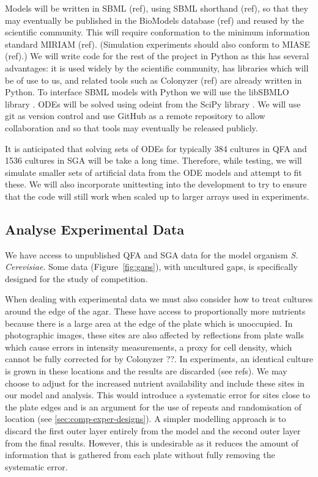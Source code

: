 Models will be written in SBML (ref), using SBML shorthand (ref), so
that they may eventually be published in the BioModels database (ref)
and reused by the scientific community. This will require conformation
to the minimum information standard MIRIAM (ref). (Simulation
experiments should also conform to MIASE (ref).) We will write code
for the rest of the project in Python as this has several advantages:
it is used widely by the scientific community, has libraries which
will be of use to us, and related tools such as Colonyzer (ref) are
already written in Python. To interface SBML models with Python we
will use the libSBMLO library \citep{Bornstein2008}. ODEs will be
solved using odeint from the SciPy library \citep{SciPy}. We will use
git as version control and use GitHub as a remote repository to allow
collaboration and so that tools may eventually be released publicly.

It is anticipated that solving sets of ODEs for typically 384 cultures
in QFA and 1536 cultures in SGA will be take a long time. Therefore,
while testing, we will simulate smaller sets of artificial data from
the ODE models and attempt to fit these. We will also incorporate
unittesting into the development to try to ensure that the code will
still work when scaled up to larger arrays used in experiments.

\subsection{Analyse Experimental Data}
\label{sec:analyse-data}
We have access to unpublished QFA and SGA data for the model organism \textit{S. Cerevisiae}. Some data (Figure~\ref{fig:gaps}), with uncultured gaps, is specifically designed for the study of competition.

When dealing with experimental data we must also consider how to treat
cultures around the edge of the agar. These have access to
proportionally more nutrients because there is a large area at the
edge of the plate which is unoccupied. In photographic images, these
sites are also affected by reflections from plate walls which cause
errors in intensity measurements, a proxy for cell density, which
cannot be fully corrected for by Colonyzer ?\citep{Lawless2010}?. In
experiments, an identical culture is grown in these locations and the
results are discarded (see refs). We may choose to adjust for the
increased nutrient availability and include these sites in our model
and analysis. This would introduce a systematic error for sites close
to the plate edges and is an argument for the use of repeats and
randomisation of location (see \ref{sec:comp-exper-designs}). A
simpler modelling approach is to discard the first outer layer
entirely from the model and the second outer layer from the final
results. However, this is undesirable as it reduces the amount of
information that is gathered from each plate without fully removing
the systematic error.

